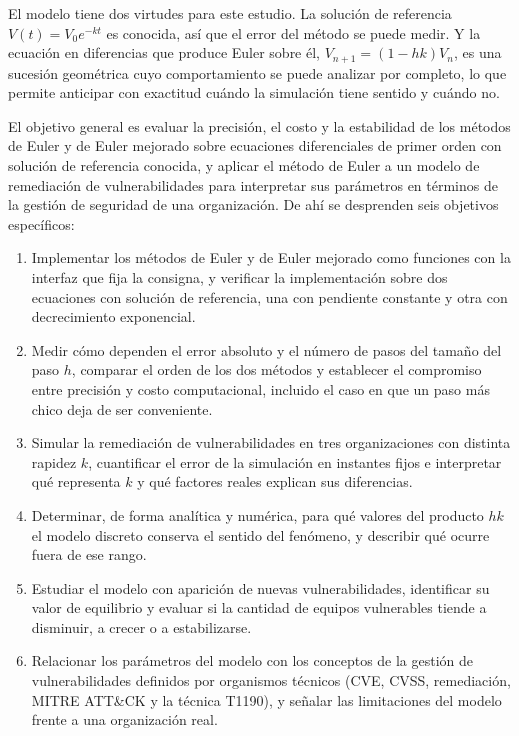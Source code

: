 El modelo tiene dos virtudes para este estudio. La solución de referencia $V(t) = V_0 e^{-kt}$
es conocida, así que el error del método se puede medir. Y la ecuación en diferencias que
produce Euler sobre él, $V_{n+1} = (1 - hk) V_n$, es una sucesión geométrica cuyo comportamiento
se puede analizar por completo, lo que permite anticipar con exactitud cuándo la simulación
tiene sentido y cuándo no.

El objetivo general es evaluar la precisión, el costo y la estabilidad de los métodos de Euler y
de Euler mejorado sobre ecuaciones diferenciales de primer orden con solución de referencia
conocida, y aplicar el método de Euler a un modelo de remediación de vulnerabilidades para
interpretar sus parámetros en términos de la gestión de seguridad de una organización. De ahí se
desprenden seis objetivos específicos:

\begin{enumerate}
  \item Implementar los métodos de Euler y de Euler mejorado como funciones con la interfaz que
  fija la consigna, y verificar la implementación sobre dos ecuaciones con solución de
  referencia, una con pendiente constante y otra con decrecimiento exponencial.
  \item Medir cómo dependen el error absoluto y el número de pasos del tamaño del paso $h$,
  comparar el orden de los dos métodos y establecer el compromiso entre precisión y costo
  computacional, incluido el caso en que un paso más chico deja de ser conveniente.
  \item Simular la remediación de vulnerabilidades en tres organizaciones con distinta rapidez
  $k$, cuantificar el error de la simulación en instantes fijos e interpretar qué representa
  $k$ y qué factores reales explican sus diferencias.
  \item Determinar, de forma analítica y numérica, para qué valores del producto $hk$ el modelo
  discreto conserva el sentido del fenómeno, y describir qué ocurre fuera de ese rango.
  \item Estudiar el modelo con aparición de nuevas vulnerabilidades, identificar su valor de
  equilibrio y evaluar si la cantidad de equipos vulnerables tiende a disminuir, a crecer o a
  estabilizarse.
  \item Relacionar los parámetros del modelo con los conceptos de la gestión de vulnerabilidades
  definidos por organismos técnicos (CVE, CVSS, remediación, MITRE ATT\&CK y la técnica T1190),
  y señalar las limitaciones del modelo frente a una organización real.
\end{enumerate}

